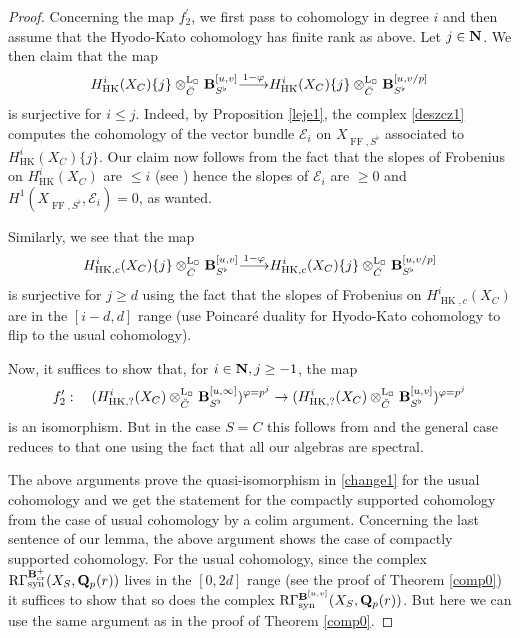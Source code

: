 \documentclass[10pt,reqno]{amsart}
\theoremstyle{definition}
\theoremstyle{remark}
\def\lomapr#1{\smash{\mathop{\relbar\joinrel\longrightarrow}\limits^{#1}}}
\def\phi{\varphi}
\newcommand{\synt}{ \operatorname{syn} }
\newcommand{\crr}{\operatorname{cr} }
\newcommand{\hk}{\operatorname{HK} }
\newcommand{\LL}{\operatorname{L} }
\newcommand{\FF}{\operatorname{FF} }
\newcommand{\se}{{\mathcal{E}}}
\numberwithin{equation}{section}
\def\R{{\mathrm R}}
\def\Q{{\bf Q}} \def\Z{{\bf Z}}
\def\N{{\bf N}}
\numberwithin{equation}{section}
\begin{document}
\begin{proof}
   Concerning the map $f_2^{\prime}$, we first pass to cohomology in degree $i$ and then assume that the Hyodo-Kato cohomology has finite rank as above.  Let $j\in\N$. We then claim that the map
  \begin{equation}\label{deszcz1}
  H^i_{\hk}(X_C)\{j\}\otimes^{\LL_{\Box}}_{\breve{C}}\B_{S^{\flat}}^{[u,v]}\lomapr{1-\phi}H^i_{\hk}(X_C)\{j\}\otimes^{\LL_{\Box}}_{\breve{C}}\B_{S^{\flat}}^{[u,v/p]}
  \end{equation}
  is surjective for $i\leq j$.  Indeed, by Proposition \ref{leje1}, the complex \eqref{deszcz1} computes the cohomology of the vector bundle $\se_i$ on $X_{\FF,S^{\flat}}$ associated to $ H^i_{\hk}(X_C)\{j\}$. Our claim now follows from the fact that the slopes of Frobenius on $  H^i_{\hk}(X_C)$ are $\leq i$ (see \cite[proof of Prop.\,5.20]{CN4}) hence the slopes of $\se_i$ are $\geq 0$ and $H^1(X_{\FF,S^{\flat}},\se_i)=0$, as wanted. 
  
 Similarly, we see that  the map
    \begin{equation}\label{deszcz11}
  H^i_{\hk,c}(X_C)\{j\}\otimes^{\LL_{\Box}}_{\breve{C}}\B_{S^{\flat}}^{[u,v]}\lomapr{1-\phi}H^i_{\hk,c}(X_C)\{j\}\otimes^{\LL_{\Box}}_{\breve{C}}\B_{S^{\flat}}^{[u,v/p]}
  \end{equation}
  is surjective for $j\geq d$ using the fact that the slopes of Frobenius on $ H^i_{\hk,c}(X_C)$ are in the $[i-d,d]$ range (use Poincar\'e duality for  Hyodo-Kato cohomology to flip to the usual cohomology).
  
  Now, it suffices to show that, for $i\in\N, j\geq -1$,  the map 
 \begin{align*}
 f^{\prime}_2:\quad (H^i_{\hk,?}(X_C)\otimes^{\LL_{\Box}}_{\breve{C}}\B_{S^{\flat}}^{[u,\infty]})^{\phi=p^j}  \to 
   (H^i_{\hk,?}(X_C)\otimes^{\LL_{\Box}}_{\breve{C}}\B_{S^{\flat}}^{[u,v]})^{\phi=p^j}
  \end{align*}
  is an isomorphism. But in the case $S=C$ this follows  from \cite[Prop.\,3.2]{Ber} and the general case reduces to that one using the fact that all our algebras are spectral.
  
    The above arguments prove the quasi-isomorphism in \eqref{change1} for the usual cohomology and  we get the statement for the compactly supported cohomology from the case of usual cohomology  by a colim argument. 
  Concerning the last sentence of our lemma, the above argument shows the case of compactly supported cohomology.   For the usual cohomology, since the complex 
   $\R\Gamma^{\B_{\crr}^+}_{\synt}(X_S,\Q_p(r))$ lives in the $[0,2d]$ range (see the proof of Theorem \ref{comp0}) it suffices to show that 
   so does the complex $ \R\Gamma^{\B^{[u,v]}}_{\synt}(X_S,\Q_p(r))$. But here we can use the same argument as in the proof of Theorem \ref{comp0}. 
    \end{proof}
\end{document}
